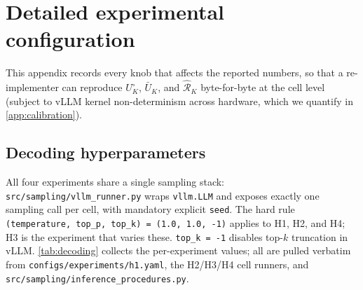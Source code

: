 \section{Detailed experimental configuration}
\label{app:config}

This appendix records every knob that affects the reported numbers, so
that a re-implementer can reproduce $U^\circ_K$, $\bar U_K$, and $\hat{\mathcal R}_K$
byte-for-byte at the cell level (subject to vLLM kernel non-determinism
across hardware, which we quantify in \cref{app:calibration}).

\subsection{Decoding hyperparameters}
\label{app:config:decoding}

All four experiments share a single sampling stack:
\texttt{src/sampling/vllm\_runner.py} wraps \texttt{vllm.LLM} and exposes
exactly one sampling call per cell, with mandatory explicit \texttt{seed}.
The hard rule \texttt{(temperature, top\_p, top\_k) = (1.0, 1.0, -1)}
applies to H1, H2, and H4; H3 is the experiment that varies these.
\texttt{top\_k = -1} disables top-$k$ truncation in vLLM. \cref{tab:decoding}
collects the per-experiment values; all are pulled verbatim from
\texttt{configs/experiments/h1.yaml}, the H2/H3/H4 cell runners, and
\texttt{src/sampling/inference\_procedures.py}.

